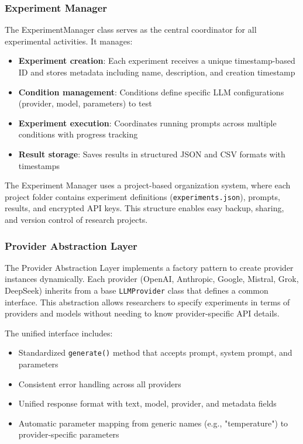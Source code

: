 \documentclass[11pt,a4paper]{article}
\begin{document}
\subsubsection{Experiment Manager}

The ExperimentManager class serves as the central coordinator for all experimental activities. It manages:
\begin{itemize}
    \item \textbf{Experiment creation}: Each experiment receives a unique timestamp-based ID and stores metadata including name, description, and creation timestamp
    \item \textbf{Condition management}: Conditions define specific LLM configurations (provider, model, parameters) to test
    \item \textbf{Experiment execution}: Coordinates running prompts across multiple conditions with progress tracking
    \item \textbf{Result storage}: Saves results in structured JSON and CSV formats with timestamps
\end{itemize}

The Experiment Manager uses a project-based organization system, where each project folder contains experiment definitions (\texttt{experiments.json}), prompts, results, and encrypted API keys. This structure enables easy backup, sharing, and version control of research projects.

\subsubsection{Provider Abstraction Layer}

The Provider Abstraction Layer implements a factory pattern to create provider instances dynamically. Each provider (OpenAI, Anthropic, Google, Mistral, Grok, DeepSeek) inherits from a base \texttt{LLMProvider} class that defines a common interface. This abstraction allows researchers to specify experiments in terms of providers and models without needing to know provider-specific API details.

The unified interface includes:
\begin{itemize}
    \item Standardized \texttt{generate()} method that accepts prompt, system prompt, and parameters
    \item Consistent error handling across all providers
    \item Unified response format with text, model, provider, and metadata fields
    \item Automatic parameter mapping from generic names (e.g., "temperature") to provider-specific parameters
\end{itemize}
\end{document}

